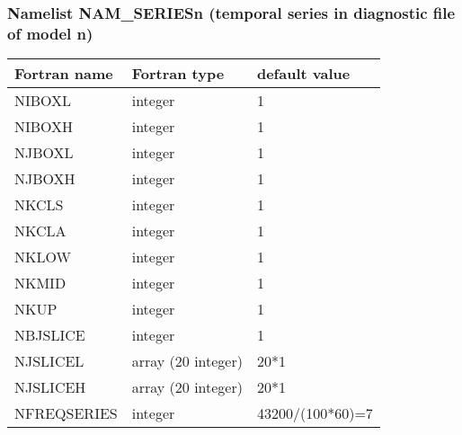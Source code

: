 \subsubsection{Namelist NAM\_SERIESn (temporal series in diagnostic file of model n)} 
\begin{center}
\begin{tabular} {|l|l|l|}
\hline
Fortran name & Fortran type & default value \\
\hline
NIBOXL       & integer      & 1             \\
NIBOXH       & integer      & 1             \\
NJBOXL       & integer      & 1             \\
NJBOXH       & integer      & 1             \\
NKCLS        & integer      & 1            \\
NKCLA        & integer      & 1             \\
NKLOW        & integer      & 1             \\
NKMID        & integer      & 1             \\
NKUP         & integer      & 1             \\
NBJSLICE     & integer      & 1             \\
NJSLICEL     & array (20 integer)      & 20*1            \\
NJSLICEH     & array (20 integer)      & 20*1            \\
NFREQSERIES  & integer      & 43200/(100*60)=7     \\
\hline
\end{tabular}
\end{center}


